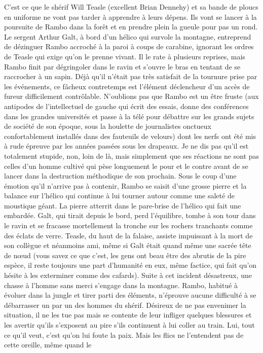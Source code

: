 %

C’est ce que le shérif Will Teasle (excellent Brian Dennehy) et sa bande de ploucs en uniforme ne vont pas tarder à apprendre à leurs dépens. Ils vont se lancer à la poursuite de Rambo dans la forêt et en prendre plein la gueule pour pas un rond. Le sergent Arthur Galt, à bord d’un hélico qui survole la montagne, entreprend de dézinguer Rambo accroché à la paroi à coups de carabine, ignorant les ordres de Teasle qui exige qu’on le prenne vivant. Il le rate à plusieurs reprises, mais Rambo finit par dégringoler dans le ravin et s’ouvre le bras en tentant de se raccrocher à un sapin. Déjà qu’il n’était pas très satisfait de la tournure prise par les événements, ce fâcheux contretemps est l’élément déclencheur d’un accès de fureur difficilement contrôlable. N’oublions pas que Rambo est un être fruste (aux antipodes de l’intellectuel de gauche qui écrit des essais, donne des conférences dans les grandes universités et passe à la télé pour débattre sur les grands sujets de société de son époque, sous la houlette de journalistes onctueux confortablement installés dans des fauteuils de velours) dont les nerfs ont été mis à rude épreuve par les années passées sous les drapeaux. Je ne dis pas qu’il est totalement stupide, non, loin de là, mais simplement que ses réactions ne sont pas celles d’un homme cultivé qui pèse longuement le pour et le contre avant de se lancer dans la destruction méthodique de son prochain. Sous le coup d’une émotion qu’il n’arrive pas à contenir, Rambo se saisit d’une grosse pierre et la balance sur l’hélico qui continue à lui tourner autour comme une saleté de moustique géant. La pierre atterrit dans le pare-brise de l’hélico qui fait une embardée. Galt, qui tirait depuis le bord, perd l’équilibre, tombe à son tour dans le ravin et se fracasse mortellement la tronche sur les rochers tranchants comme des éclats de verre. Teasle, du haut de la falaise, assiste impuissant à la mort de son collègue et néanmoins ami, même si Galt était quand même une sacrée tête de nœud (vous savez ce que c’est, les gens ont beau être des abrutis de la pire espèce, il reste toujours une part d’humanité en eux, même factice, qui fait qu’on hésite à les exterminer comme des cafards). Suite à cet incident désastreux, une chasse à l’homme sans merci s’engage dans la montagne. Rambo, habitué à évoluer dans la jungle et tirer parti des éléments, n’éprouve aucune difficulté à se débarrasser un par un des hommes du shérif. Désireux de ne pas envenimer la situation, il ne les tue pas mais se contente de leur infliger quelques blessures et les avertir qu’ils s’exposent au pire s’ils continuent à lui coller au train. Lui, tout ce qu’il veut, c’est qu’on lui foute la paix. Mais les flics ne l’entendent pas de cette oreille, même quand le 